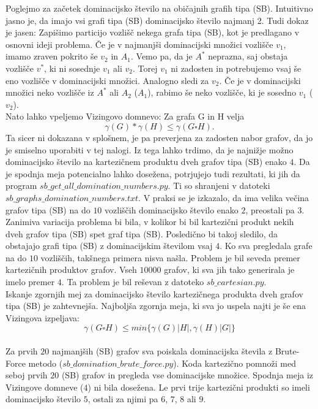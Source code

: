 \documentclass{article}
\begin{document}
Poglejmo za začetek dominacijsko število na običajnih grafih tipa (SB).
Intuitivno jasno je, da imajo vsi grafi tipa (SB) dominacijsko število najmanj 2. Tudi dokaz je jasen:
Zapišimo particijo vozlišč nekega grafa tipa (SB), kot je predlagano v osnovni ideji problema.
Če je v najmanjši dominacijski množici vozlišče $v_1$, imamo zraven pokrito še $v_2$ in 
$A_1$. Vemo pa, da je $A^*$ neprazna, saj obstaja vozlišče $v^*$, ki ni 
sosednje $v_1$ ali $v_2$. Torej $v_1$ ni zadosten in potrebujemo vsaj še eno vozlišče v dominacijski množici.
Analogno sledi za $v_2$. Če je v dominacijski množici neko vozlišče iz $A^*$ ali $A_2$ ($A_1$), rabimo še neko
vozlišče, ki je sosedno $v_1$ ($v_2$).  
\\
Nato lahko vpeljemo Vizingovo domnevo: Za grafa G in H velja
$$ \gamma(G)*\gamma(H) \leq \gamma(G\square H). $$
Ta sicer ni dokazana v splošnem, je pa preverjena za zadosten nabor grafov, da jo je smiselno uporabiti v 
tej nalogi.
Iz tega lahko trdimo, da je najnižje možno dominacijsko število na 
kartezičnem produktu dveh grafov tipa (SB) enako $4$. Da je spodnja meja potencialno lahko dosežena, potrjujejo tudi rezultati, ki jih da program 
$sb\_get\_all\_domination\_numbers.py$. Ti so shranjeni v datoteki $sb\_graphs\_domination\_numbers.txt$.
V praksi se je izkazalo, da ima velika večina grafov tipa (SB) na do $10$
vozliščih dominacijsko število enako $2$, preostali pa $3$.
\\
Zanimiva variacija problema bi bila, v kolikor bi bil kartezični produkt nekih
dveh grafov tipa (SB) spet graf tipa (SB). Posledično bi takoj sledilo, da obstajajo 
grafi tipa (SB) z dominacijskim številom vsaj $4$. Ko sva pregledala grafe na do $10$ vozliščih, 
takšnega primera nisva našla. Problem je bil seveda premer kartezičnih produktov grafov. Vseh $10000$ grafov, ki 
sva jih tako generirala je imelo premer $4$. Ta problem je bil reševan z datoteko $sb\_cartesian.py$.
\\
Iskanje zgornjih mej za dominacijsko število kartezičnega produkta dveh grafov tipa (SB) je zahtevnejša.
Najboljša zgornja meja, ki sva jo uspela najti je še ena Vizingova izpeljava:
$$ \gamma(G\square H) \leq min\{\gamma(G)\lvert H \rvert, \gamma(H)\lvert G \rvert\}$$
\\
Za prvih $20$ najmanjših (SB) grafov sva poiskala dominacijska števila z Brute-Force metodo ($sb\_domination\_brute\_force.py$). 
Koda kartezično pomnoži med seboj prvih $20$ (SB) grafov in pregleda vse dominacijske množice.
Spodnja meja iz Vizingove domneve ($4$) ni bila dosežena. Le prvi trije kartezični produkti so imeli dominacijsko število 
$5$, ostali za njimi pa $6$, $7$, $8$ ali $9$. 
\end{document}
